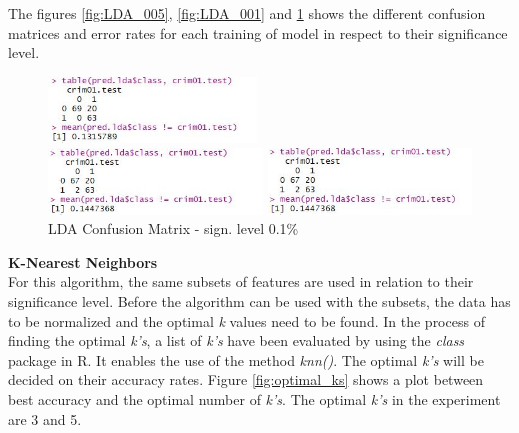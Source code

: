 The figures \ref{fig:LDA_005}, \ref{fig:LDA_001} and \ref{fig:LDA_0001} shows the different confusion matrices and error rates for each training of model in respect to their significance level. 

\begin{figure}[H]
\centering
\begin{minipage}{0.32\textwidth}
\centering
    \includegraphics[width=\linewidth, height=50pt]{Graphics/Assignment1/LDAConfusionsMatrix_005.JPG}
    \caption{LDA Confusion Matrix - sign. level 5\%}
    \label{fig:LDA_005}
\end{minipage}\hfill
\begin{minipage}{0.32\textwidth}
\centering

\includegraphics[width=\linewidth, height= 50pt]{Graphics/Assignment1/LDAConfusionsMatrix_001.JPG}
    \caption{LDA Confusion Matrix - sign. level 1\%}
    \label{fig:LDA_001}
\end{minipage}\hfill
\begin{minipage}{0.32\textwidth}
\centering

\includegraphics[width=\linewidth, height= 50pt]{Graphics/Assignment1/LDAConfusionsMatrix_0001.JPG}
    \caption{LDA Confusion Matrix - sign. level 0.1\%}
    \label{fig:LDA_0001}
\end{minipage}
\end{figure}


\noindent
\textbf{K-Nearest Neighbors}\\
For this algorithm, the same subsets of features are used in relation to their significance level. Before the algorithm can be used with the subsets, the data has to be normalized and the optimal \textit{k} values need to be found. In the process of finding the optimal \textit{k's}, a list of \textit{k's} have been evaluated by using the \textit{class} package in R. It enables the use of the method \textit{knn()}. The optimal \textit{k's} will be decided on their accuracy rates. Figure \ref{fig:optimal_ks} shows a plot between best accuracy and the optimal number of \textit{k's}. The optimal \textit{k's} in the experiment are 3 and 5. 

